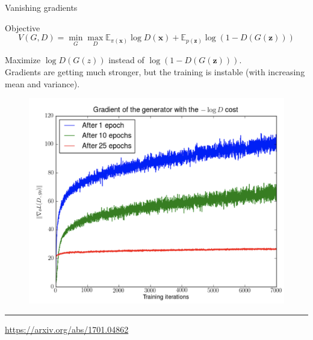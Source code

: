 \documentclass{beamer}
\newcommand{\bx}{\mathbf{x}}
\newcommand{\bz}{\mathbf{z}}
\newcommand{\bbE}{\mathbb{E}}
\begin{document}
\begin{frame}{Vanishing gradients}
	\begin{block}{Objective}
		\vspace{-0.4cm}
		\[
		V(G, D) = \min_{G} \max_D \bbE_{\pi(\bx)} \log D(\bx) + \bbE_{p(\bz)} \log (1 - D(G(\bz)))
		\]
		\vspace{-0.4cm}
	\end{block}
	\begin{minipage}[t]{0.45\columnwidth}
		\vspace{0.4cm}
		Maximize $\log D(G(z))$ instead of $\log (1 - D(G(\bz)))$. \\
		Gradients are getting much stronger, but the training is instable (with increasing mean and variance).
	\end{minipage}%
	\begin{minipage}[t]{0.55\columnwidth}
		\begin{figure}
			\centering
			\includegraphics[width=1.0\linewidth]{figs/vanishing_gradients_3}
		\end{figure}
	\end{minipage}
	\vfill
	\hrule\medskip
	{\scriptsize \href{https://arxiv.org/abs/1701.04862}{https://arxiv.org/abs/1701.04862}}
\end{frame}
\end{document}
